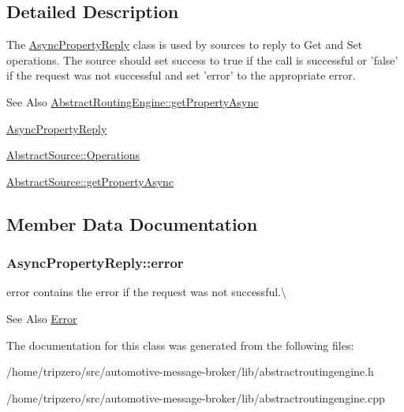 \subsection{Detailed Description}
The \hyperlink{classAsyncPropertyReply}{Async\-Property\-Reply} class is used by sources to reply to Get and Set operations. The source should set success to true if the call is successful or 'false' if the request was not successful and set 'error' to the appropriate error. 

\begin{DoxySeeAlso}{See Also}
\hyperlink{classAbstractRoutingEngine_ad1cbda415f674be4a3ce49be05aa8ee8}{Abstract\-Routing\-Engine\-::get\-Property\-Async} 

\hyperlink{classAsyncPropertyReply}{Async\-Property\-Reply} 

\hyperlink{classAbstractSource_aad1e5e4914f2aa174dfd8fa6e143c1b9}{Abstract\-Source\-::\-Operations} 

\hyperlink{classAbstractSource_a05589e699ea16a14675db226d51bdf9f}{Abstract\-Source\-::get\-Property\-Async} 
\end{DoxySeeAlso}


\subsection{Member Data Documentation}
\hypertarget{classAsyncPropertyReply_a8c5cb98a6e2a72d6d94b43449a5e842d}{
\subsubsection[{error}]{ Async\-Property\-Reply\-::error}}\label{classAsyncPropertyReply_a8c5cb98a6e2a72d6d94b43449a5e842d}


error contains the error if the request was not successful.\textbackslash{} 

\begin{DoxySeeAlso}{See Also}
\hyperlink{classAsyncPropertyReply_ad91affaa25fcc3b73947a6cf4591e5d1}{Error} 
\end{DoxySeeAlso}


The documentation for this class was generated from the following files\-:\begin{DoxyCompactItemize}
\item 
/home/tripzero/src/automotive-\/message-\/broker/lib/abstractroutingengine.\-h\item 
/home/tripzero/src/automotive-\/message-\/broker/lib/abstractroutingengine.\-cpp\end{DoxyCompactItemize}
